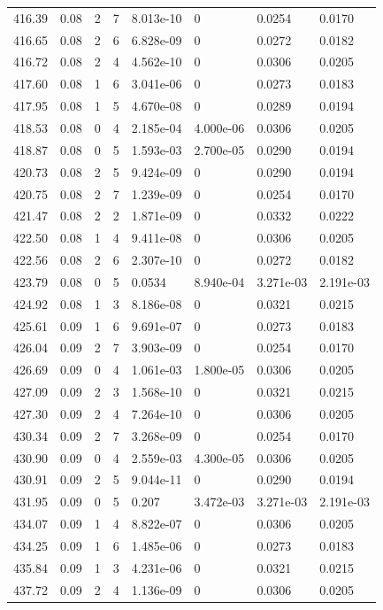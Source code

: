 \documentclass[preview]{standalone}
\begin{document}
{{{{{{{{{{{\begin{tabular}{L{1.2cm}C{1.2cm} C{0.3cm}C{0.5cm} C{1.4cm}C{1.4cm} C{1.4cm}C{1.4cm}}
  416.39  &  0.08  & 2     &  7 &  8.013e-10  & 0  & 0.0254 &  0.0170   \\ 
  416.65  &  0.08  & 2     &  6 &  6.828e-09  & 0  & 0.0272 &  0.0182   \\ 
  416.72  &  0.08  & 2     &  4 &  4.562e-10  & 0  & 0.0306 &  0.0205   \\ 
  417.60  &  0.08  & 1     &  6 &  3.041e-06  & 0  & 0.0273 &  0.0183   \\ 
  417.95  &  0.08  & 1     &  5 &  4.670e-08  & 0  & 0.0289 &  0.0194   \\ 
  418.53  &  0.08  & 0     &  4 &  2.185e-04  & 4.000e-06  & 0.0306 &  0.0205   \\ 
  418.87  &  0.08  & 0     &  5 &  1.593e-03  & 2.700e-05  & 0.0290 &  0.0194   \\ 
  420.73  &  0.08  & 2     &  5 &  9.424e-09  & 0  & 0.0290 &  0.0194   \\ 
  420.75  &  0.08  & 2     &  7 &  1.239e-09  & 0  & 0.0254 &  0.0170   \\ 
  421.47  &  0.08  & 2     &  2 &  1.871e-09  & 0  & 0.0332 &  0.0222   \\ 
  422.50  &  0.08  & 1     &  4 &  9.411e-08  & 0  & 0.0306 &  0.0205   \\ 
  422.56  &  0.08  & 2     &  6 &  2.307e-10  & 0  & 0.0272 &  0.0182   \\ 
  423.79  &  0.08  & 0     &  5 &  0.0534  & 8.940e-04  & 3.271e-03 &  2.191e-03   \\ 
  424.92  &  0.08  & 1     &  3 &  8.186e-08  & 0  & 0.0321 &  0.0215   \\ 
  425.61  &  0.09  & 1     &  6 &  9.691e-07  & 0  & 0.0273 &  0.0183   \\ 
  426.04  &  0.09  & 2     &  7 &  3.903e-09  & 0  & 0.0254 &  0.0170   \\ 
  426.69  &  0.09  & 0     &  4 &  1.061e-03  & 1.800e-05  & 0.0306 &  0.0205   \\ 
  427.09  &  0.09  & 2     &  3 &  1.568e-10  & 0  & 0.0321 &  0.0215   \\ 
  427.30  &  0.09  & 2     &  4 &  7.264e-10  & 0  & 0.0306 &  0.0205   \\ 
  430.34  &  0.09  & 2     &  7 &  3.268e-09  & 0  & 0.0254 &  0.0170   \\ 
  430.90  &  0.09  & 0     &  4 &  2.559e-03  & 4.300e-05  & 0.0306 &  0.0205   \\ 
  430.91  &  0.09  & 2     &  5 &  9.044e-11  & 0  & 0.0290 &  0.0194   \\ 
  431.95  &  0.09  & 0     &  5 &  0.207  & 3.472e-03  & 3.271e-03 &  2.191e-03   \\ 
  434.07  &  0.09  & 1     &  4 &  8.822e-07  & 0  & 0.0306 &  0.0205   \\ 
  434.25  &  0.09  & 1     &  6 &  1.485e-06  & 0  & 0.0273 &  0.0183   \\ 
  435.84  &  0.09  & 1     &  3 &  4.231e-06  & 0  & 0.0321 &  0.0215   \\ 
  437.72  &  0.09  & 2     &  4 &  1.136e-09  & 0  & 0.0306 &  0.0205   \\ 
\hline 
\end{tabular} 

}}}}}}}}}}}
\end{document}
